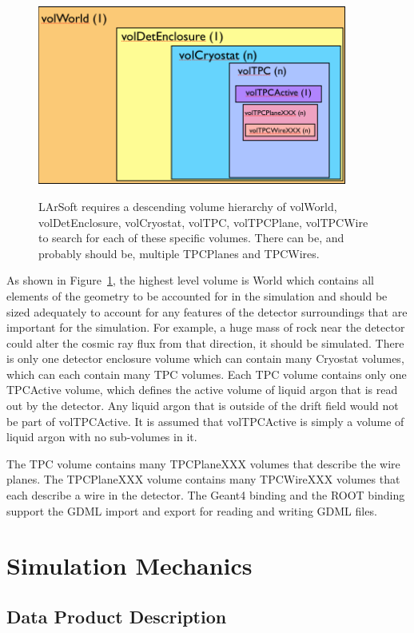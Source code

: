 \documentclass[12pt]{elsarticle}
\newcommand{\larsoft}{LArSoft }
\begin{document}
\begin{figure}[h]
\center
\caption{\larsoft requires a descending volume hierarchy of volWorld, volDetEnclosure, volCryostat, volTPC, volTPCPlane, volTPCWire to search for each of these specific volumes. There can be, and probably should be, multiple TPCPlanes and TPCWires.}
\includegraphics[width=4.0in]{./imgs/geometry_volumes.png}
\label{geo-vol.img}
\end{figure}

As shown in Figure~\ref{geo-vol.img},
the highest level volume is World which contains all elements of the geometry to be accounted for in the simulation and should be sized adequately to account for any features of the detector surroundings that are important for the simulation. For example, a huge mass of rock near the detector could alter the cosmic ray flux from that direction, it should be simulated. There is only one detector enclosure volume which can contain many Cryostat volumes, which can each contain many TPC volumes. Each TPC volume contains only one TPCActive volume, which defines the active volume of liquid argon that is read out by the detector. Any liquid argon that is outside of the drift field would not be part of volTPCActive. It is assumed that volTPCActive is simply a volume of liquid argon with no sub-volumes in it. 

The TPC volume contains many TPCPlaneXXX volumes that describe the wire planes. The TPCPlaneXXX volume contains many TPCWireXXX volumes that each describe a wire in the detector. The Geant4 binding and the ROOT binding support the GDML import and export for reading and writing GDML files.
                    
\section{Simulation Mechanics}

\subsection{Data Product Description}
\end{document}
